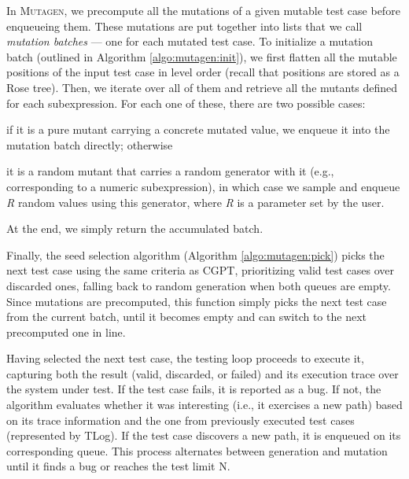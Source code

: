 \documentclass[sigconf, anonymous, review]{acmart}
\newcommand{\mutagen}{\textsc{Mutagen}\xspace}
\begin{document}
In \mutagen, we precompute all the mutations of a given mutable test case before
enqueueing them.
%
These mutations are put together into lists that we call \emph{mutation batches}
--- one for each mutated test case.
%
To initialize a mutation batch (outlined in Algorithm \ref{algo:mutagen:init}),
we first flatten all the mutable positions of the input test case in level order
(recall that positions are stored as a Rose tree).
%
Then, we iterate over all of them and retrieve all the mutants defined for each
subexpression.
%
For each one of these, there are two possible cases:
%
\begin{inparaenum}
\item if it is a pure mutant carrying a concrete mutated value, we enqueue it
  into the mutation batch directly; otherwise
\item it is a random mutant that carries a random generator with it (e.g.,
  corresponding to a numeric subexpression), in which case we sample and enqueue
  \textit{R} random values using this generator, where \textit{R} is a parameter
  set by the user.
\end{inparaenum}
%
At the end, we simply return the accumulated batch.


Finally, the seed selection algorithm (Algorithm \ref{algo:mutagen:pick}) picks
the next test case using the same criteria as CGPT, prioritizing valid test
cases over discarded ones, falling back to random generation when both queues
are empty.
%
Since mutations are precomputed, this function simply picks the next test case
from the current batch, until it becomes empty and can switch to the next
precomputed one in line.


Having selected the next test case, the testing loop proceeds to execute it,
capturing both the result (valid, discarded, or failed) and its execution trace
over the system under test.
%
If the test case fails, it is reported as a bug.
%
If not, the algorithm evaluates whether it was interesting (i.e., it exercises a
new path) based on its trace information and the one from previously executed
test cases (represented by TLog).
%
If the test case discovers a new path, it is enqueued on its corresponding
queue.
%
%
This process alternates between generation and mutation until it finds a bug or
reaches the test limit N.
\end{document}
